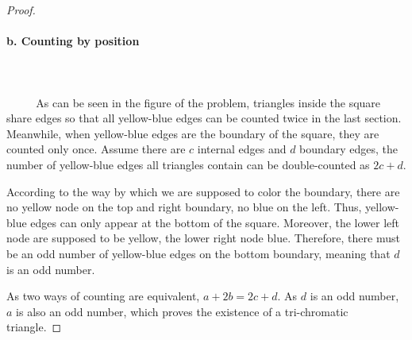 \documentclass[oneside,solution]{seu-ml-assign}
\begin{document}
\begin{proof}
\paragraph{b. Counting by position}
\\ \hspace*{\fill} \\
$\text{        }\quad\text{  }$
As can be seen in the figure of the problem,
triangles inside the square share edges so that all yellow-blue edges
can be counted twice in the last section. Meanwhile, when yellow-blue
edges are the boundary of the square, they are counted only once. Assume
there are \(c\) internal edges and \(d\) boundary edges, the number of
yellow-blue edges all triangles contain can be double-counted as
\(2c+d\).

According to the way by which we are supposed to color the boundary,
there are no yellow node on the top and right boundary, no blue on the
left. Thus, yellow-blue edges can only appear at the bottom of the
square. Moreover, the lower left node are supposed to be yellow, the
lower right node blue. Therefore, there must be an odd number of
yellow-blue edges on the bottom boundary, meaning that \(d\) is an odd
number.

As two ways of counting are equivalent, \(a+2b=2c+d\). As \(d\) is an
odd number, \(a\) is also an odd number, which proves the existence of a
tri-chromatic triangle.
\end{proof}
\end{document}

